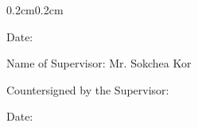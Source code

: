 \begin{adjustwidth}{0.2cm}{0.2cm}
    \vspace{-0.1cm}
    \setlength{\parindent}{0pt}
    {\large Date: \dotfill\par}

    \vspace{0.5cm}
    \setlength{\parindent}{0pt}
    {\large Name of Supervisor: Mr. Sokchea Kor\par}
    
    \vspace{-0.1cm}
    \setlength{\parindent}{0pt}
    {\large Countersigned by the Supervisor: \dotfill\par}
    
    \vspace{-0.1cm}
    \setlength{\parindent}{0pt}
    {\large Date: \dotfill\par}

    
\end{adjustwidth}